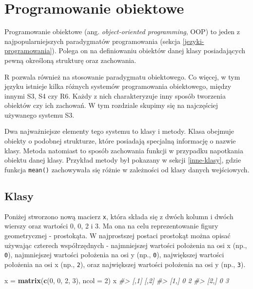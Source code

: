 \documentclass[paper=6in:9in,pagesize=pdftex,headinclude=on,footinclude=on,10pt]{scrbook}
\newenvironment{Shaded}{\begin{snugshade}}{\end{snugshade}}
\newcommand{\CommentTok}[1]{\textcolor[rgb]{0.56,0.35,0.01}{\textit{#1}}}
\newcommand{\DataTypeTok}[1]{\textcolor[rgb]{0.13,0.29,0.53}{#1}}
\newcommand{\DecValTok}[1]{\textcolor[rgb]{0.00,0.00,0.81}{#1}}
\newcommand{\KeywordTok}[1]{\textcolor[rgb]{0.13,0.29,0.53}{\textbf{#1}}}
\newcommand{\NormalTok}[1]{#1}
\newcommand{\StringTok}[1]{\textcolor[rgb]{0.31,0.60,0.02}{#1}}
\begin{document}
\hypertarget{oop}{%
\section{Programowanie obiektowe}\label{oop}}

Programowanie obiektowe (ang. \emph{object-oriented programming}, OOP) to jeden z najpopularniejszych paradygmatów programowania (sekcja \ref{jezyki-programowania}).
Polega on na definiowaniu obiektów danej klasy posiadających pewną określoną strukturę oraz zachowania.

R pozwala również na stosowanie paradygmatu obiektowego.
Co więcej, w tym języku istnieje kilka różnych systemów programowania obiektowego, między innymi S3, S4 czy R6.
Każdy z nich charakteryzuje inny sposób tworzenia obiektów czy ich zachowań.
W tym rozdziale skupimy się na najczęściej używanego systemu S3.

Dwa najważniejsze elementy tego systemu to klasy i metody.
Klasa obejmuje obiekty o podobnej strukturze, które posiadają specjalną informację o nazwie klasy.
Metoda natomiast to sposób zachowania funkcji w przypadku napotkania obiektu danej klasy.
Przykład metody był pokazany w sekcji \ref{inne-klasy}, gdzie funkcja \texttt{mean()} zachowywała się różnie w zależności od klasy danych wejściowych.

\hypertarget{klasy}{%
\subsection{Klasy}\label{klasy}}

Poniżej stworzono nową macierz \texttt{x}, która składa się z dwóch kolumn i dwóch wierszy oraz wartości 0, 0, 2 i 3.
Ma ona na celu reprezentowanie figury geometrycznej - prostokąta.
W najprostszej postaci prostokąt można opisać używając czterech współrzędnych - najmniejszej wartości położenia na osi x (np., \texttt{0}), najmniejszej wartości położenia na osi y (np., \texttt{0}), największej wartości położenia na osi x (np., \texttt{2}), oraz największej wartości położenia na osi y (np., \texttt{3}).

\begin{Shaded}
\begin{Highlighting}[]
\NormalTok{x =}\StringTok{ }\KeywordTok{matrix}\NormalTok{(}\KeywordTok{c}\NormalTok{(}\DecValTok{0}\NormalTok{, }\DecValTok{0}\NormalTok{, }\DecValTok{2}\NormalTok{, }\DecValTok{3}\NormalTok{), }\DataTypeTok{ncol =} \DecValTok{2}\NormalTok{)}
\NormalTok{x}
\CommentTok{#>      [,1] [,2]}
\CommentTok{#> [1,]    0    2}
\CommentTok{#> [2,]    0    3}
\end{Highlighting}
\end{Shaded}
\end{document}
